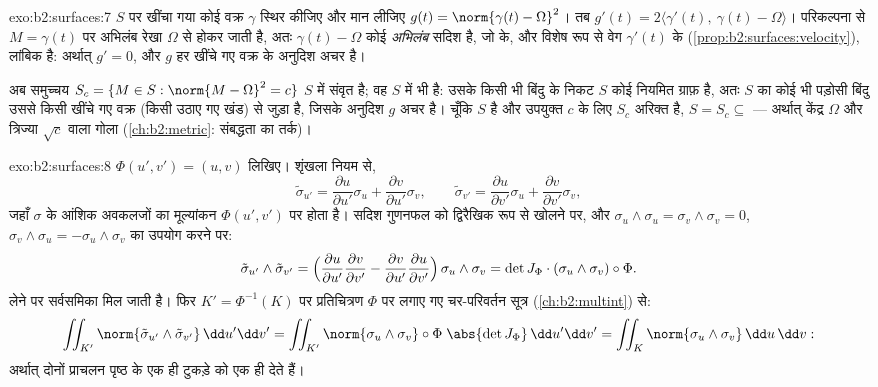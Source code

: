\begin{solution}{exo:b2:surfaces:7}
$S$ पर खींचा गया कोई वक्र $\gamma$ स्थिर कीजिए और मान लीजिए $g(t) = \norm{\gamma(t)
- \Omega}^2$।
तब $g'(t) = 2\langle \gamma'(t),\ \gamma(t) -
\Omega\rangle$। परिकल्पना से $M = \gamma(t)$ पर अभिलंब रेखा $\Omega$ से होकर जाती है,
अतः $\gamma(t) - \Omega$ कोई \emph{अभिलंब} सदिश है, जो  के, और विशेष
रूप से वेग $\gamma'(t)$ के (\cref{prop:b2:surfaces:velocity}), लांबिक है: अर्थात् $g' =
0$, और $g$ हर
खींचे गए वक्र के अनुदिश अचर है।

अब समुच्चय $S_c = \{M \in S : \norm{M - \Omega}^2 = c\}$ $S$ में संवृत है; वह $S$ में  भी है: उसके
किसी भी बिंदु के निकट $S$ कोई नियमित ग्राफ़ है, अतः $S$ का कोई भी
पड़ोसी बिंदु उससे किसी खींचे गए वक्र (किसी उठाए गए खंड) से जुड़ा
है, जिसके अनुदिश $g$ अचर है। चूँकि $S$  है और उपयुक्त $c$
के लिए $S_c$ अरिक्त है, $S = S_c
\subseteq$ --- अर्थात् केंद्र $\Omega$ और त्रिज्या
$\sqrt c$ वाला गोला (\cref{ch:b2:metric}: संबद्धता का तर्क)।
\end{solution}

\begin{solution}{exo:b2:surfaces:8}
$\Phi(u', v') = (u, v)$ लिखिए। शृंखला नियम से,
\[
\tilde\sigma_{u'} = \frac{\partial u}{\partial u'}\sigma_u
+ \frac{\partial v}{\partial u'}\sigma_v,
\qquad
\tilde\sigma_{v'} = \frac{\partial u}{\partial v'}\sigma_u
+ \frac{\partial v}{\partial v'}\sigma_v ,
\]
जहाँ $\sigma$ के आंशिक अवकलजों का मूल्यांकन $\Phi(u',v')$ पर होता है। सदिश
गुणनफल को द्विरैखिक रूप से खोलने पर, और $\sigma_u \wedge \sigma_u =
\sigma_v \wedge \sigma_v = 0$, $\sigma_v \wedge \sigma_u =
-\sigma_u \wedge \sigma_v$ का उपयोग करने पर:
\[
\tilde\sigma_{u'} \wedge \tilde\sigma_{v'}
= \Bigl(\frac{\partial u}{\partial u'}
\frac{\partial v}{\partial v'}
- \frac{\partial v}{\partial u'}
\frac{\partial u}{\partial v'}\Bigr)\,
\sigma_u \wedge \sigma_v
= \det J_\Phi \cdot (\sigma_u \wedge \sigma_v)\circ\Phi .
\]
 लेने पर सर्वसमिका मिल जाती है। फिर $K' =
\Phi^{-1}(K)$ पर प्रतिचित्रण $\Phi$
पर लगाए गए चर-परिवर्तन सूत्र (\cref{ch:b2:multint}) से:
\[
\iint_{K'} \norm{\tilde\sigma_{u'} \wedge \tilde\sigma_{v'}}
\,\dd u'\dd v'
= \iint_{K'} \norm{\sigma_u \wedge \sigma_v}\circ\Phi\;
\abs{\det J_\Phi}\,\dd u'\dd v'
= \iint_K \norm{\sigma_u \wedge \sigma_v}\,\dd u\,\dd v :
\]
अर्थात् दोनों प्राचलन पृष्ठ के एक ही टुकड़े को एक ही  देते हैं।
\end{solution}

